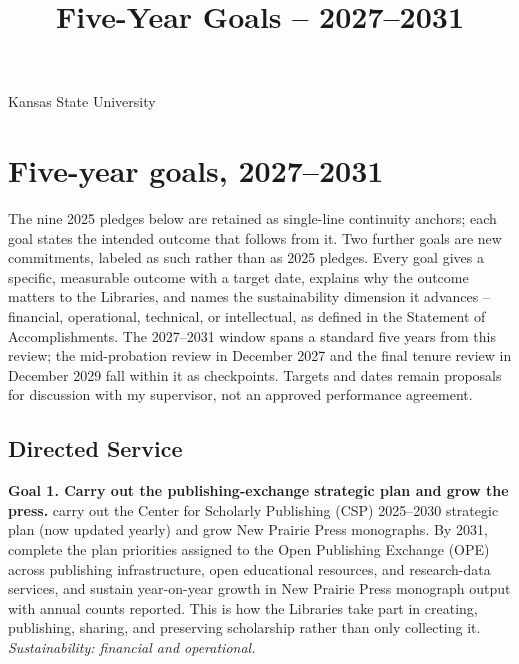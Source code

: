 \title{Five-Year Goals -- 2027--2031}
\address{University Library}{Kansas State University}
\portfoliotitle

\begingroup
\setlength{\parindent}{1.5em}
\setlength{\parskip}{0.45em}
\section{Five-year goals, 2027--2031}
The nine 2025 pledges below are retained as single-line continuity anchors;
each goal states the intended outcome that follows from it. Two further goals
are new commitments, labeled as such rather than as 2025 pledges. Every goal
gives a specific, measurable outcome with a target date, explains why the
outcome matters to the Libraries, and names the sustainability dimension it
advances -- financial, operational, technical, or intellectual, as defined in
the Statement of Accomplishments. The 2027--2031 window spans a standard five
years from this review; the mid-probation review in December 2027 and the
final tenure review in December 2029 fall within it as checkpoints. Targets
and dates remain proposals for discussion with my supervisor, not an approved
performance agreement.

\subsection{Directed Service}
\textbf{Goal 1. Carry out the publishing-exchange strategic plan and grow the press.} carry out the Center for Scholarly Publishing (CSP) 2025--2030 strategic plan (now updated yearly) and grow New Prairie Press monographs. By 2031, complete the plan priorities assigned to the Open Publishing Exchange (OPE) across publishing infrastructure, open educational resources, and research-data services, and sustain year-on-year growth in New Prairie Press monograph output with annual counts reported. This is how the Libraries take part in creating, publishing, sharing, and preserving scholarship rather than only collecting it. \textit{Sustainability: financial and operational.}

